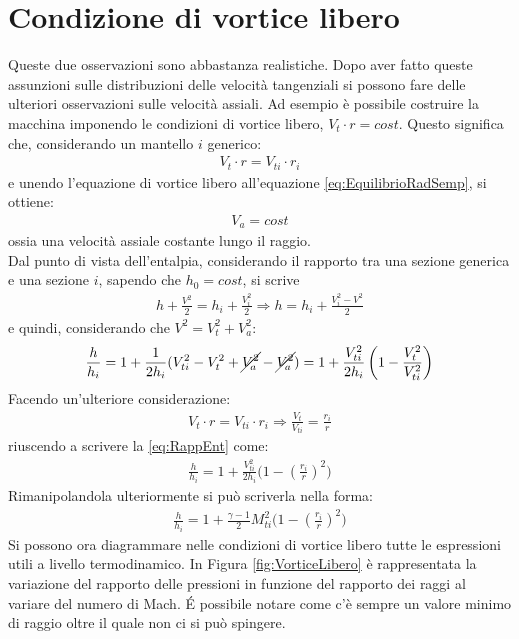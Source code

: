 \section{Condizione di vortice libero}
Queste due osservazioni sono abbastanza realistiche. Dopo aver fatto queste assunzioni sulle distribuzioni delle velocità tangenziali si possono fare delle ulteriori osservazioni sulle velocità assiali.  Ad esempio è possibile costruire la macchina imponendo le condizioni di vortice libero, $V_t \cdot r = cost$.
Questo significa che, considerando un mantello $i$ generico:
\begin{align*}
V_t \cdot r = V_{ti} \cdot r_i
\end{align*}
e unendo l'equazione di vortice libero all'equazione \ref{eq:EquilibrioRadSemp}, si ottiene:
\begin{align*}
V_a=cost
\end{align*}
ossia una velocità assiale costante lungo il raggio.\\
Dal punto di vista dell'entalpia, considerando il rapporto tra una sezione generica e una sezione $i$, sapendo che $h_0 = cost$, si scrive
\begin{align*}
h + \frac{V^2}{2} = h_i + \frac{V_i^2}{2} \Rightarrow h = h_i	+ \frac{V_i^2 - V^2}{2}
\end{align*}
e quindi, considerando che $V^2=V_t^2+V_a^2$:
\begin{equation}
\frac{h}{h_i} = 1 + \frac{1}{2h_i} (V_{ti}^2-V_t^2 + \cancel{V_a^2} -\cancel{V_a^2}) = 1 + \frac{V_{ti}^2}{2h_i} \left( 1- \frac{V_t^2}{V_{ti}^2} \right)
\label{eq:RappEnt}
\end{equation}
Facendo un'ulteriore considerazione:
\begin{align*}
V_t \cdot r = V_{ti} \cdot r_i \Rightarrow \frac{V_t}{V_{ti}} = \frac{r_i}{r}
\end{align*}
riuscendo a scrivere la \ref{eq:RappEnt} come:
\begin{align*}
\frac{h}{h_i} = 1 + \frac{V_{ti}^2}{2h_i} \bigg(1 -  \left( \frac{r_i}{r}\right)^2 \bigg)
\end{align*}
Rimanipolandola ulteriormente si può scriverla nella forma:
\begin{align*}
\boxed{\frac{h}{h_i} = 1 + \frac{\gamma -1}{2} M_{ti}^2 \bigg(1 -  \left( \frac{r_i}{r}\right)^2 \bigg) }
\end{align*}
Si possono ora diagrammare nelle condizioni di vortice libero tutte le espressioni utili a livello termodinamico. In Figura \ref{fig:VorticeLibero} è rappresentata la variazione del rapporto delle pressioni in funzione del rapporto dei raggi al variare del numero di Mach. \'E possibile notare come c'è sempre un valore minimo di raggio oltre il quale non ci si può spingere.
